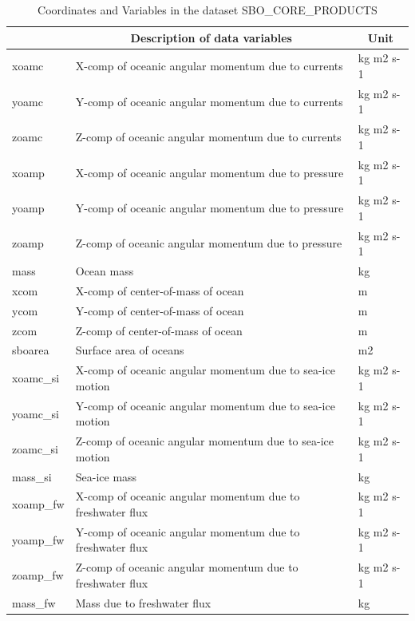 \begin{longtable}{|m{}|m{}|m{}|}
\caption{Coordinates and Variables in the dataset SBO\_CORE\_PRODUCTS}
\label{tab:table-SBO_CORE_PRODUCTS-fields} \\ 
\hline \endhead \hline \endfoot
\rowcolor{lightgray} \multicolumn{1}{|c|}{\textbf{Variables}} & \multicolumn{1}{|c|}{\textbf{Description of data variables}} &  \multicolumn{1}{|c|}{\textbf{Unit}}\\ \hline
xoamc &X-comp of oceanic angular momentum due to currents &kg m2 s-1  \\ \hline
yoamc &Y-comp of oceanic angular momentum due to currents &kg m2 s-1  \\ \hline
zoamc &Z-comp of oceanic angular momentum due to currents &kg m2 s-1  \\ \hline
xoamp &X-comp of oceanic angular momentum due to pressure &kg m2 s-1  \\ \hline
yoamp &Y-comp of oceanic angular momentum due to pressure &kg m2 s-1  \\ \hline
zoamp &Z-comp of oceanic angular momentum due to pressure &kg m2 s-1  \\ \hline
mass &Ocean mass &kg  \\ \hline
xcom &X-comp of center-of-mass of ocean &m  \\ \hline
ycom &Y-comp of center-of-mass of ocean &m  \\ \hline
zcom &Z-comp of center-of-mass of ocean &m  \\ \hline
sboarea &Surface area of oceans &m2  \\ \hline
xoamc\_si &X-comp of oceanic angular momentum due to sea-ice motion &kg m2 s-1  \\ \hline
yoamc\_si &Y-comp of oceanic angular momentum due to sea-ice motion &kg m2 s-1  \\ \hline
zoamc\_si &Z-comp of oceanic angular momentum due to sea-ice motion &kg m2 s-1  \\ \hline
mass\_si &Sea-ice mass &kg  \\ \hline
xoamp\_fw &X-comp of oceanic angular momentum due to freshwater flux &kg m2 s-1  \\ \hline
yoamp\_fw &Y-comp of oceanic angular momentum due to freshwater flux &kg m2 s-1  \\ \hline
zoamp\_fw &Z-comp of oceanic angular momentum due to freshwater flux &kg m2 s-1  \\ \hline
mass\_fw &Mass due to freshwater flux &kg  \\ \hline

\end{longtable}
